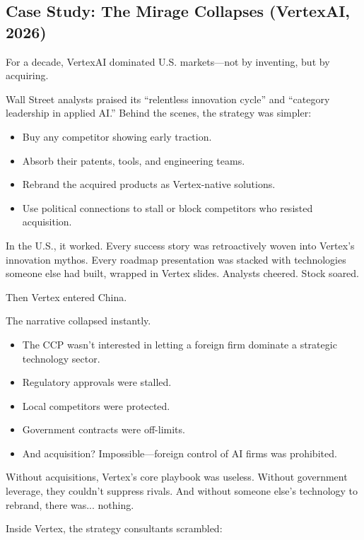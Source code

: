 \subsection{Case Study: The Mirage Collapses (VertexAI, 2026)}

For a decade, VertexAI dominated U.S. markets—not by inventing, but by acquiring.

Wall Street analysts praised its “relentless innovation cycle” and “category leadership in applied AI.”  
Behind the scenes, the strategy was simpler:  
\begin{itemize}
  \item Buy any competitor showing early traction.
  \item Absorb their patents, tools, and engineering teams.
  \item Rebrand the acquired products as Vertex-native solutions.
  \item Use political connections to stall or block competitors who resisted acquisition.
\end{itemize}

In the U.S., it worked.  Every success story was retroactively woven into Vertex’s innovation mythos.  Every roadmap presentation was stacked with technologies someone else had built, wrapped in Vertex slides.  Analysts cheered.  Stock soared.

\medskip

Then Vertex entered China.

The narrative collapsed instantly.

\begin{itemize}
  \item The CCP wasn’t interested in letting a foreign firm dominate a strategic technology sector.  
  \item Regulatory approvals were stalled.  
  \item Local competitors were protected.  
  \item Government contracts were off-limits.  
  \item And acquisition? Impossible—foreign control of AI firms was prohibited.
\end{itemize}

Without acquisitions, Vertex’s core playbook was useless.  Without government leverage, they couldn’t suppress rivals.  And without someone else’s technology to rebrand, there was... nothing.

\medskip

Inside Vertex, the strategy consultants scrambled:

